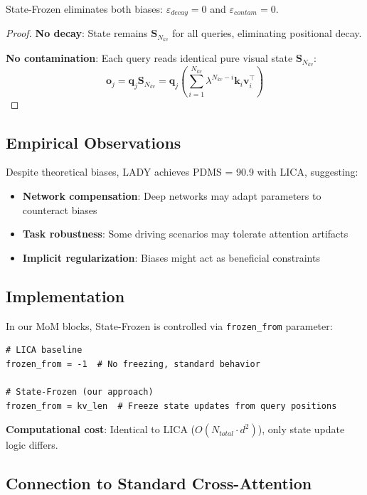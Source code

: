 \begin{theorem}
State-Frozen eliminates both biases: $\varepsilon_{decay} = 0$ and $\varepsilon_{contam} = 0$.
\end{theorem}

\begin{proof}
\textbf{No decay}: State remains $\mathbf{S}_{N_{kv}}$ for all queries, eliminating positional decay.

\textbf{No contamination}: Each query reads identical pure visual state $\mathbf{S}_{N_{kv}}$:
$$\mathbf{o}_j = \mathbf{q}_j \mathbf{S}_{N_{kv}} = \mathbf{q}_j \left(\sum_{i=1}^{N_{kv}} \lambda^{N_{kv}-i} \mathbf{k}_i \mathbf{v}_i^\top \right)$$
\end{proof}

\subsection{Empirical Observations}

Despite theoretical biases, LADY achieves PDMS = 90.9 with LICA, suggesting:
\begin{itemize}
    \item \textbf{Network compensation}: Deep networks may adapt parameters to counteract biases
    \item \textbf{Task robustness}: Some driving scenarios may tolerate attention artifacts
    \item \textbf{Implicit regularization}: Biases might act as beneficial constraints
\end{itemize}

\subsection{Implementation}

In our MoM blocks, State-Frozen is controlled via \texttt{frozen\_from} parameter:

\begin{verbatim}
# LICA baseline
frozen_from = -1  # No freezing, standard behavior

# State-Frozen (our approach)  
frozen_from = kv_len  # Freeze state updates from query positions
\end{verbatim}

\textbf{Computational cost}: Identical to LICA ($O(N_{total} \cdot d^2)$), only state update logic differs.

\subsection{Connection to Standard Cross-Attention}

